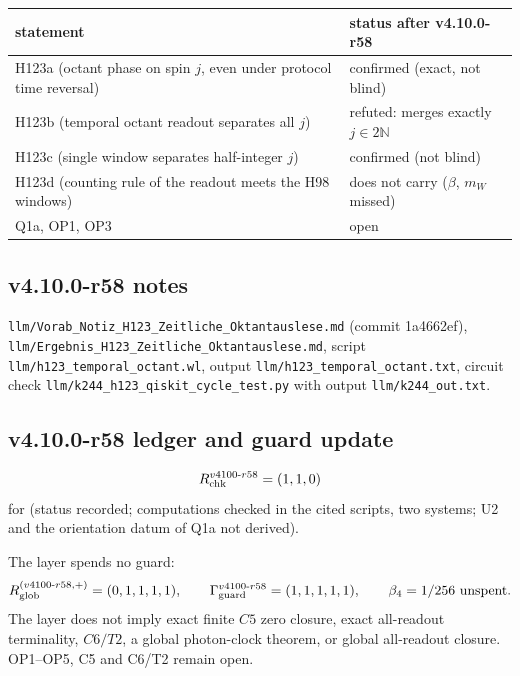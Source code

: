 \begin{center}
\small
\begin{tabular}{@{}>{\raggedright\arraybackslash}p{}>{\raggedright\arraybackslash}p{}@{}}
\toprule
statement & status after v4.10.0-r58\\
\midrule
H123a (octant phase on spin \(j\), even under protocol time reversal) & confirmed (exact, not blind)\\
H123b (temporal octant readout separates all \(j\)) & refuted: merges exactly \(j\in2\mathbb N\)\\
H123c (single window separates half-integer \(j\)) & confirmed (not blind)\\
H123d (counting rule of the readout meets the H98 windows) & does not carry (\(\beta\), \(m_W\) missed)\\
Q1a, OP1, OP3 & open\\
\bottomrule
\end{tabular}
\end{center}

\subsection*{v4.10.0-r58 notes}
\label{subsec:v4100-r58-notes}

\texttt{llm/\allowbreak Vorab\_\allowbreak Notiz\_\allowbreak H123\_\allowbreak Zeitliche\_\allowbreak Oktantauslese.md} (commit 1a4662ef),
\texttt{llm/\allowbreak Ergebnis\_\allowbreak H123\_\allowbreak Zeitliche\_\allowbreak Oktantauslese.md}, script \texttt{llm/\allowbreak h123\_\allowbreak temporal\_\allowbreak octant.wl},
output \texttt{llm/\allowbreak h123\_\allowbreak temporal\_\allowbreak octant.txt}, circuit check \texttt{llm/\allowbreak k244\_\allowbreak h123\_\allowbreak qiskit\_\allowbreak cycle\_\allowbreak test.py}
with output \texttt{llm/\allowbreak k244\_\allowbreak out.txt}.

\subsection*{v4.10.0-r58 ledger and guard update}
\label{subsec:v4100-r58-ledger-guard}

\[
R_{\rm chk}^{v4100\text{-}r58}=(1,1,0)
\]
for (status recorded; computations checked in the cited scripts, two systems; U2 and the orientation datum of Q1a not derived).

The layer spends no guard:
\[
R_{\rm glob}^{(v4100\text{-}r58,+)}=(0,1,1,1,1),
\qquad
\Gamma_{\rm guard}^{v4100\text{-}r58}=(1,1,1,1,1),
\qquad
\beta_4=1/256\ \text{unspent}.
\]
The layer does not imply exact finite \(C5\) zero closure, exact all-readout terminality, \(C6/T2\), a global photon-clock theorem,
or global all-readout closure.  OP1--OP5, C5 and C6/T2 remain open.

